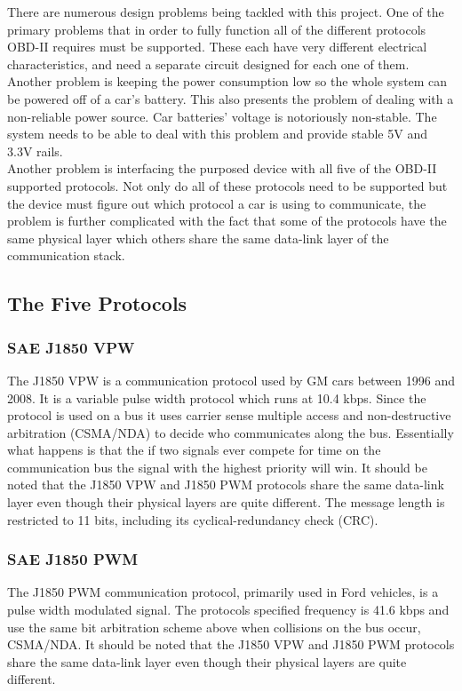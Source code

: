 \documentclass[12pt,letterpaper]{article}
\begin{document}
There are numerous design problems being tackled with this project. One of the primary problems that in order to fully function all of the different protocols OBD-II requires must be supported. These each have very different electrical characteristics, and need a separate circuit designed for each one of them. Another problem is keeping the power consumption low so the whole system can be powered off of a car's battery. This also presents the problem of dealing with a non-reliable power source. Car batteries' voltage is notoriously non-stable. The system needs to be able to deal with this problem and provide stable 5V and 3.3V rails. \\

Another problem is interfacing the purposed device with all five of the OBD-II supported protocols. Not only do all of these protocols need to be supported but the device must figure out which protocol a car is using to communicate, the problem is further complicated with the fact that some of the protocols have the same physical layer which others share the same data-link layer of the communication stack. 

\subsection{The Five Protocols}
\subsubsection{SAE J1850 VPW}
The J1850 VPW is a communication protocol used by GM cars between 1996 and 2008. It is a variable pulse width protocol which runs at 10.4 kbps. Since the protocol is used on a bus it uses carrier sense multiple access and non-destructive arbitration (CSMA/NDA) to decide who communicates along the bus. Essentially what happens is that the if two signals ever compete for time on the communication bus the signal with the highest priority will win. It should be noted that the J1850 VPW and J1850 PWM protocols share the same data-link layer even though their physical layers are quite different. The message length is restricted to 11 bits, including its cyclical-redundancy check (CRC).
 
\subsubsection{SAE J1850 PWM}
The J1850 PWM communication protocol, primarily used in Ford vehicles, is a pulse width modulated signal. The protocols specified frequency is 41.6 kbps and use the same bit arbitration scheme above when collisions on the bus occur, CSMA/NDA. It should be noted that the J1850 VPW and J1850 PWM protocols share the same data-link layer even though their physical layers are quite different.
\end{document}

